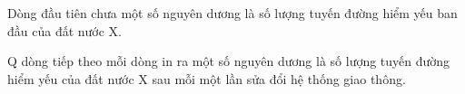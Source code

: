 Dòng đầu tiên chưa một số nguyên dương là số lượng tuyến đường hiểm yếu ban đầu của đất nước X.  

   Q dòng tiếp theo mỗi dòng in ra một số nguyên dương là số lượng tuyến đường hiểm yếu của đất nước X sau mỗi một lần sửa đổi hệ thống giao thông.